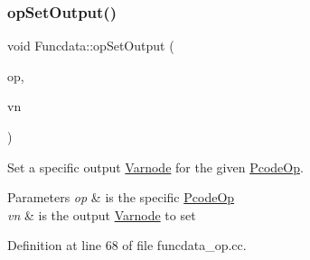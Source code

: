 \subsubsection{\texorpdfstring{opSetOutput()}{opSetOutput()}}
{\footnotesize\ttfamily void Funcdata\+::op\+Set\+Output (\begin{DoxyParamCaption}\item[{\mbox{\hyperlink{class_pcode_op}{Pcode\+Op}} $\ast$}]{op,  }\item[{\mbox{\hyperlink{class_varnode}{Varnode}} $\ast$}]{vn }\end{DoxyParamCaption})}



Set a specific output \mbox{\hyperlink{class_varnode}{Varnode}} for the given \mbox{\hyperlink{class_pcode_op}{Pcode\+Op}}. 


\begin{DoxyParams}{Parameters}
{\em op} & is the specific \mbox{\hyperlink{class_pcode_op}{Pcode\+Op}} \\
\hline
{\em vn} & is the output \mbox{\hyperlink{class_varnode}{Varnode}} to set \\
\hline
\end{DoxyParams}


Definition at line 68 of file funcdata\+\_\+op.\+cc.

